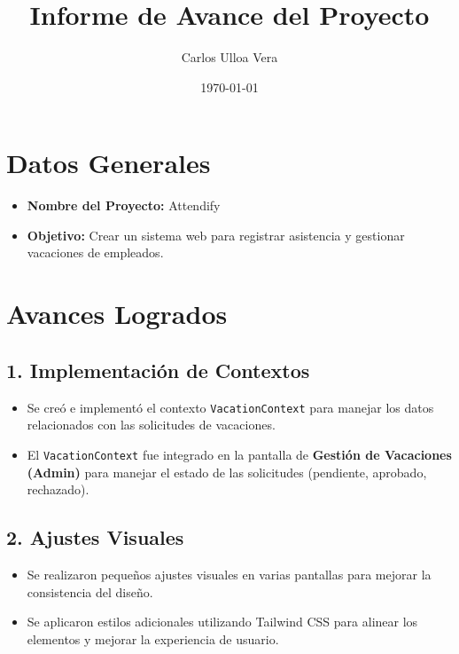 \documentclass[12pt]{article}
\title{Informe de Avance del Proyecto}
\author{Carlos Ulloa Vera}
\date{\today}
\begin{document}
\maketitle

\section*{Datos Generales}

\begin{itemize}
  \item \textbf{Nombre del Proyecto:} Attendify
  \item \textbf{Objetivo:} Crear un sistema web para registrar asistencia y gestionar vacaciones de empleados.
\end{itemize}

\section*{Avances Logrados}

\subsection*{1. Implementación de Contextos}
\begin{itemize}
  \item Se creó e implementó el contexto \texttt{VacationContext} para manejar los datos relacionados con las solicitudes de vacaciones.
  \item El \texttt{VacationContext} fue integrado en la pantalla de \textbf{Gestión de Vacaciones (Admin)} para manejar el estado de las solicitudes (pendiente, aprobado, rechazado).
\end{itemize}

\subsection*{2. Ajustes Visuales}
\begin{itemize}
  \item Se realizaron pequeños ajustes visuales en varias pantallas para mejorar la consistencia del diseño.
  \item Se aplicaron estilos adicionales utilizando Tailwind CSS para alinear los elementos y mejorar la experiencia de usuario.
\end{itemize}
\end{document}
